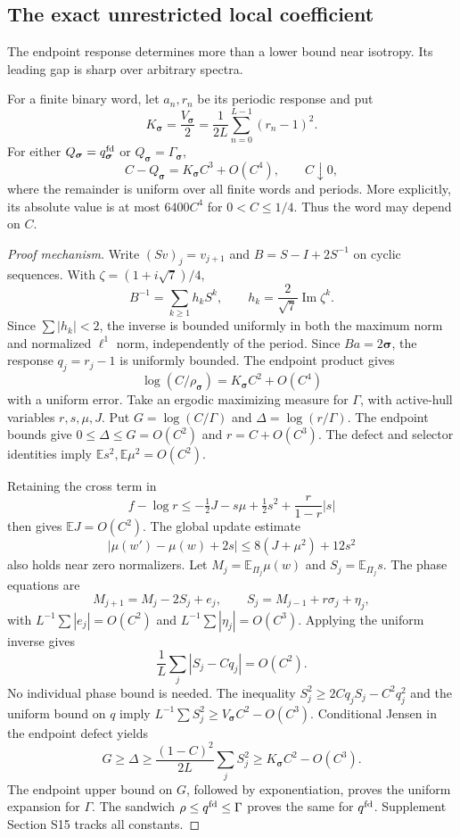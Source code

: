 \documentclass[letterpaper,twoside]{article}
\begin{document}
\subsection{The exact unrestricted local coefficient}
The endpoint response determines more than a lower bound near isotropy. Its leading gap is sharp over arbitrary spectra.

\begin{theorem}\label{cor:cubic}
For a finite binary word, let $a_n,r_n$ be its periodic response and put
\[
 K_{\bm\sigma}=\frac{V_{\bm\sigma}}2
 =\frac1{2L}\sum_{n=0}^{L-1}(r_n-1)^2.
\]
For either $Q_{\bm\sigma}=q^{\rm fd}_{\bm\sigma}$ or $Q_{\bm\sigma}=\Gamma_{\bm\sigma}$,
\begin{equation}\label{eq:exact-cubic-main}
 C-Q_{\bm\sigma}=K_{\bm\sigma}C^3+O(C^4),
 \qquad C\downarrow0,
\end{equation}
where the remainder is uniform over all finite words and periods. More explicitly, its absolute value is at most $6400C^4$ for $0<C\le1/4$. Thus the word may depend on $C$.
\end{theorem}

\begin{proof}[Proof mechanism]
Write $(Sv)_j=v_{j+1}$ and $B=S-I+2S^{-1}$ on cyclic sequences. With $\zeta=(1+i\sqrt7)/4$,
\[
 B^{-1}=\sum_{k\ge1}h_kS^k,\qquad
 h_k=\frac2{\sqrt7}\operatorname{Im}\zeta^k.
\]
Since $\sum|h_k|<2$, the inverse is bounded uniformly in both the maximum norm and normalized $\ell^1$ norm, independently of the period. Since $Ba=2\bm\sigma$, the response $q_j=r_j-1$ is uniformly bounded. The endpoint product gives
\[
 \log(C/\rho_{\bm\sigma})=K_{\bm\sigma}C^2+O(C^4)
\]
with a uniform error. Take an ergodic maximizing measure for $\Gamma$, with active-hull variables $r,s,\mu,J$. Put $G=\log(C/\Gamma)$ and $\Delta=\log(r/\Gamma)$. The endpoint bounds give $0\le\Delta\le G=O(C^2)$ and $r=C+O(C^3)$. The defect and selector identities imply $\mathbb E s^2,\mathbb E\mu^2=O(C^2)$.

Retaining the cross term in
\[
 f-\log r\le-\tfrac12J-s\mu+\tfrac12s^2
                  +\frac r{1-r}|s|
\]
then gives $\mathbb EJ=O(C^2)$. The global update estimate
\[
 |\mu(w')-\mu(w)+2s|
 \le8(J+\mu^2)+12s^2
\]
also holds near zero normalizers. Let $M_j=\mathbb E_{\Pi_j}\mu(w)$ and $S_j=\mathbb E_{\Pi_j}s$. The phase equations are
\[
 M_{j+1}=M_j-2S_j+e_j,\qquad
 S_j=M_{j-1}+r\sigma_j+\eta_j,
\]
with $L^{-1}\sum|e_j|=O(C^2)$ and $L^{-1}\sum|\eta_j|=O(C^3)$. Applying the uniform inverse gives
\[
 \frac1L\sum_j|S_j-Cq_j|=O(C^2).
\]
No individual phase bound is needed. The inequality
$S_j^2\ge2Cq_jS_j-C^2q_j^2$ and the uniform bound on $q$ imply $L^{-1}\sum S_j^2\ge V_{\bm\sigma}C^2-O(C^3)$. Conditional Jensen in the endpoint defect yields
\[
 G\ge\Delta\ge\frac{(1-C)^2}{2L}\sum_jS_j^2
       \ge K_{\bm\sigma}C^2-O(C^3).
\]
The endpoint upper bound on $G$, followed by exponentiation, proves the uniform expansion for $\Gamma$. The sandwich $\rho\le q^{\rm fd}\le\Gamma$ proves the same for $q^{\rm fd}$. Supplement Section S15 tracks all constants.
\end{proof}
\end{document}
